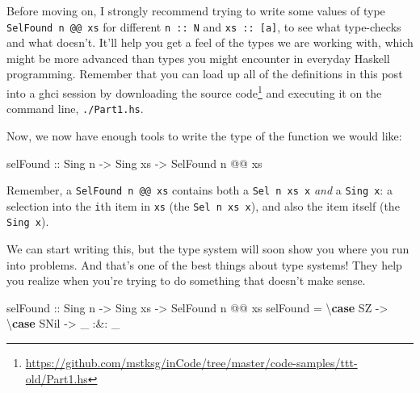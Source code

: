 \documentclass[]{article}
\newenvironment{Shaded}{}{}
\newcommand{\DataTypeTok}[1]{\textcolor[rgb]{0.56,0.13,0.00}{#1}}
\newcommand{\KeywordTok}[1]{\textcolor[rgb]{0.00,0.44,0.13}{\textbf{#1}}}
\newcommand{\NormalTok}[1]{#1}
\newcommand{\OperatorTok}[1]{\textcolor[rgb]{0.40,0.40,0.40}{#1}}
\newcommand{\OtherTok}[1]{\textcolor[rgb]{0.00,0.44,0.13}{#1}}
\renewcommand{\href}[2]{#2\footnote{\url{#1}}}
\begin{document}
Before moving on, I strongly recommend trying to write some values of type
\texttt{SelFound\ n\ @@\ xs} for different \texttt{n\ ::\ N} and
\texttt{xs\ ::\ {[}a{]}}, to see what type-checks and what doesn't. It'll help
you get a feel of the types we are working with, which might be more advanced
than types you might encounter in everyday Haskell programming. Remember that
you can load up all of the definitions in this post into a ghci session by
downloading
\href{https://github.com/mstksg/inCode/tree/master/code-samples/ttt-old/Part1.hs}{the
source code} and executing it on the command line, \texttt{./Part1.hs}.

Now, we now have enough tools to write the type of the function we would like:

\begin{Shaded}
\begin{Highlighting}[]
\NormalTok{selFound}
\OtherTok{    ::} \DataTypeTok{Sing}\NormalTok{ n}
    \OtherTok{{-}\textgreater{}} \DataTypeTok{Sing}\NormalTok{ xs}
    \OtherTok{{-}\textgreater{}} \DataTypeTok{SelFound}\NormalTok{ n }\OperatorTok{@@}\NormalTok{ xs}
\end{Highlighting}
\end{Shaded}

Remember, a \texttt{SelFound\ n\ @@\ xs} contains both a \texttt{Sel\ n\ xs\ x}
\emph{and} a \texttt{Sing\ x}: a selection into the \texttt{i}th item in
\texttt{xs} (the \texttt{Sel\ n\ xs\ x}), and also the item itself (the
\texttt{Sing\ x}).

We can start writing this, but the type system will soon show you where you run
into problems. And that's one of the best things about type systems! They help
you realize when you're trying to do something that doesn't make sense.

\begin{Shaded}
\begin{Highlighting}[]
\NormalTok{selFound}
\OtherTok{    ::} \DataTypeTok{Sing}\NormalTok{ n}
    \OtherTok{{-}\textgreater{}} \DataTypeTok{Sing}\NormalTok{ xs}
    \OtherTok{{-}\textgreater{}} \DataTypeTok{SelFound}\NormalTok{ n }\OperatorTok{@@}\NormalTok{ xs}
\NormalTok{selFound }\OtherTok{=}\NormalTok{ \textbackslash{}}\KeywordTok{case}
    \DataTypeTok{SZ} \OtherTok{{-}\textgreater{}}\NormalTok{ \textbackslash{}}\KeywordTok{case}
      \DataTypeTok{SNil} \OtherTok{{-}\textgreater{}}\NormalTok{ \_ }\OperatorTok{:\&:}\NormalTok{ \_}
\end{Highlighting}
\end{Shaded}
\end{document}
